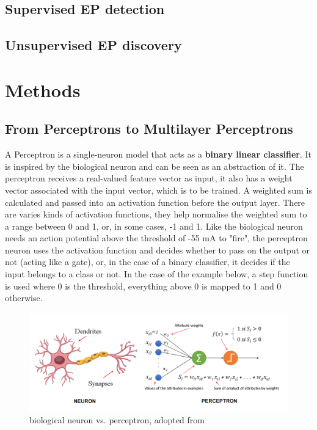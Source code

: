 \documentclass[nobib]{tufte-handout}
\begin{document}
\subsection{Supervised EP detection}
\noindent
\subsection{Unsupervised EP discovery}
\noindent

\bigskip
\section{Methods}
\subsection{\textbf{From Perceptrons to Multilayer Perceptrons}}

A Perceptron is a single-neuron model that acts as a \textbf{binary linear classifier}. It is inspired by the biological neuron and can be seen as an abstraction of it. The perceptron receives a real-valued feature vector as input, it also has a weight vector associated with the input vector, which is to be trained. A weighted sum is calculated and passed into an activation function before the output layer. There are varies kinds of activation functions, they help normalise the weighted sum to a range between 0 and 1, or, in some cases, -1 and 1. Like the biological neuron needs an action potential above the threshold of -55 mA to "fire", the perceptron neuron uses the activation function and decides whether to pass on the output or not (acting like a gate), or, in the case of a binary classifier, it decides if the input belongs to a class or not. In the case of the example below, a step function is used where 0 is the threshold, everything above 0 is mapped to 1 and 0 otherwise. 
\begin{figure}
  \includegraphics{perceptron1.png}
  \caption{biological neuron vs. perceptron, adopted from \cite{IF:perceptron}}
\end{figure}
\end{document}
